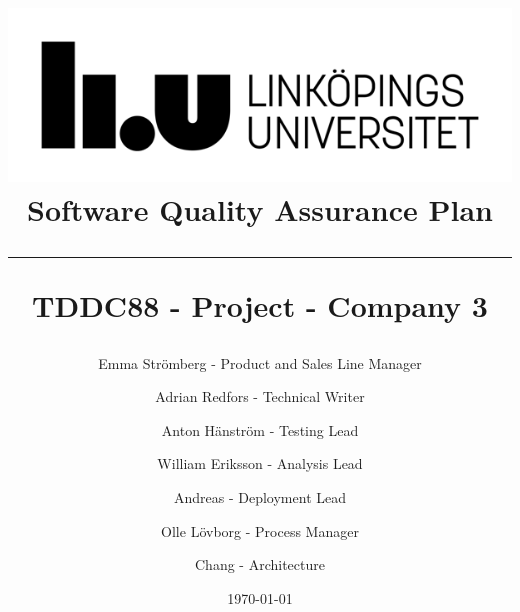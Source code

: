 \documentclass{article}
\title{
\includegraphics[scale=1.5]{liu_logga.png} \\
\vspace{2.0cm} \textbf{Software Quality Assurance Plan} \\
 \endgraf\rule{\textwidth}{.4pt}
  \large \textbf{TDDC88 - Project - Company 3}\\
}
\author{
    Emma Strömberg - Product and Sales Line Manager \and 
    Adrian Redfors - Technical Writer \and 
    Anton Hänström - Testing Lead \and 
    William Eriksson - Analysis Lead \and 
    Andreas - Deployment Lead \and 
    Olle Lövborg - Process Manager \and 
    Chang - Architecture
}
\date{\today}
\begin{document}

\end{document}
